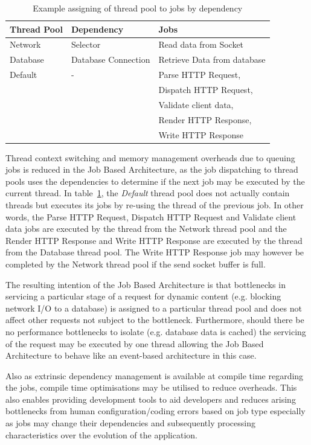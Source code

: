 \documentclass[conference]{ieee/IEEEtran}
\begin{document}
\begin{table}[!t]
\renewcommand{\arraystretch}{1.3}
\caption{Example assigning of thread pool to jobs by dependency}
\label{tab:example_request_thread_pools}
\centering
\begin{tabular}{l||l||l}
\hline
\bfseries Thread Pool & \bfseries Dependency & \bfseries Jobs \\
\hline\hline
Network & Selector & Read data from Socket \\
\hline
Database & Database Connection & Retrieve Data from database \\
\hline
Default & - & Parse HTTP Request, \\
& & Dispatch HTTP Request, \\
& & Validate client data, \\ 
& & Render HTTP Response, \\
& & Write HTTP Response \\
\hline
\end{tabular}
\end{table}

Thread context switching and memory management overheads due to queuing jobs is
reduced in the Job Based Architecture, as the job dispatching to thread pools
uses the dependencies to determine if the next job may be executed by the
current thread.  In table~\ref{tab:example_request_thread_pools}, the
\textit{Default} thread pool does not actually contain threads but executes its
jobs by re-using the thread of the previous job.  In other words, the Parse HTTP
Request, Dispatch HTTP Request and Validate client data jobs are executed by the
thread from the Network thread pool and the Render HTTP Response and Write HTTP
Response are executed by the thread from the Database thread pool.  The Write
HTTP Response job may however be completed by the Network thread pool if the
send socket buffer is full.

The resulting intention of the Job Based Architecture is that bottlenecks in
servicing a particular stage of a request for dynamic content (e.g. blocking
network I/O to a database) is assigned to a particular thread pool and does not
affect other requests not subject to the bottleneck. Furthermore, should there
be no performance bottlenecks to isolate (e.g. database data is cached) the
servicing of the request may be executed by one thread allowing the Job Based
Architecture to behave like an event-based architecture in this case.

Also as extrinsic dependency management is available at compile time regarding
the jobs, compile time optimisations may be utilised to reduce overheads.  This
also enables providing development tools to aid developers and reduces arising
bottlenecks from human configuration/coding errors based on job type especially
as jobs may change their dependencies and subsequently processing
characteristics over the evolution of the application.
\end{document}
